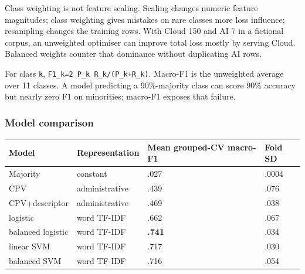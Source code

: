 Class weighting is not feature scaling. Scaling changes numeric feature
magnitudes; class weighting gives mistakes on rare classes more loss
influence; resampling changes the training rows. With Cloud 150 and AI 7
in a fictional corpus, an unweighted optimiser can improve total loss
mostly by serving Cloud. Balanced weights counter that dominance without
duplicating AI rows.

For class \texttt{k}, \texttt{F1\_k=2\ P\_k\ R\_k/(P\_k+R\_k)}. Macro-F1
is the unweighted average over 11 classes. A model predicting a
90\%-majority class can score 90\% accuracy but nearly zero F1 on
minorities; macro-F1 exposes that failure.

\subsubsection{Model comparison}\label{model-comparison}

{\def\LTcaptype{none} %
\begin{longtable}[]{@{}
  >{\raggedright\arraybackslash}p{}
  >{\raggedright\arraybackslash}p{}
  >{\raggedleft\arraybackslash}p{}
  >{\raggedleft\arraybackslash}p{}@{}}
\toprule\noalign{}
\begin{minipage}[b]{\linewidth}\raggedright
Model
\end{minipage} & \begin{minipage}[b]{\linewidth}\raggedright
Representation
\end{minipage} & \begin{minipage}[b]{\linewidth}\raggedleft
Mean grouped-CV macro-F1
\end{minipage} & \begin{minipage}[b]{\linewidth}\raggedleft
Fold SD
\end{minipage} \\
\midrule\noalign{}
\endhead
\bottomrule\noalign{}
\endlastfoot
Majority & constant & .027 & .0004 \\
CPV & administrative & .439 & .076 \\
CPV+descriptor & administrative & .469 & .038 \\
logistic & word TF-IDF & .662 & .067 \\
balanced logistic & word TF-IDF & \textbf{.741} & .034 \\
linear SVM & word TF-IDF & .717 & .030 \\
balanced SVM & word TF-IDF & .716 & .054 \\
\end{longtable}
}

